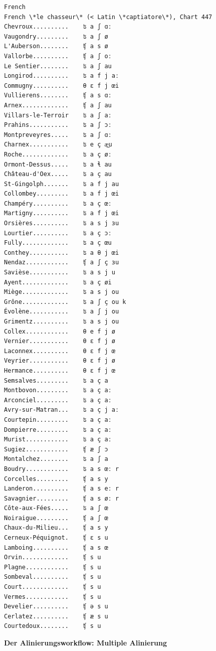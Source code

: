 \begin{verbatim}
French
French \*le chasseur\* (< Latin \*captiatore\*), Chart 447
Chevroux..........    ʦ a ʃ ɑː
Vaugondry.........    ʦ a ʃ ø
L'Auberson........    ʧ a s ø
Vallorbe..........    ʧ a ʃ oː
Le Sentier........    ʦ a ʃ au
Longirod..........    ʦ a f j aː
Commugny..........    θ ɛ f j œi
Vullierens........    ʧ a s ɑː
Arnex.............    ʧ a ʃ au
Villars-le-Terroir    ʦ a ʃ aː
Prahins...........    ʦ a ʃ ɔː
Montpreveyres.....    ʦ a ʃ ɑː
Charnex...........    ʦ e ç æ͜u
Roche.............    ʦ a ç øː
Ormont-Dessus.....    ʦ a ɬ au
Château-d'Oex.....    ʦ a ç au
St-Gingolph.......    ʦ a f j au
Collombey.........    ʦ a f j œi
Champéry..........    ʦ a ç œː
Martigny..........    ʦ a f j œi
Orsières..........    ʦ a s j ɜu
Lourtier..........    ʦ a ç ɔː
Fully.............    ʦ a ç œu
Conthey...........    ʦ a θ j œi
Nendaz............    ʧ a ʃ ç ɜu
Savièse...........    ʦ a s j u
Ayent.............    ʦ a ç øi
Miège.............    ʦ a s j ou
Grône.............    ʦ a ʃ ç ou k
Évolène...........    ʦ a ʃ j ou
Grimentz..........    ʦ a s j ou
Collex............    θ e f j ø
Vernier...........    θ ɛ f j ø
Laconnex..........    θ ɛ f j œ
Veyrier...........    θ ɛ f j ø
Hermance..........    θ ɛ f j œ
Semsalves.........    ʦ a ç a
Montbovon.........    ʦ a ç aː
Arconciel.........    ʦ a ç aː
Avry-sur-Matran...    ʦ a ç j aː
Courtepin.........    ʦ a ç aː
Dompierre.........    ʦ a ç aː
Murist............    ʦ a ç aː
Sugiez............    ʧ æ ʃ ɔ
Montalchez........    ʦ a ʃ a
Boudry............    ʦ a s œː r
Corcelles.........    ʧ a s y
Landeron..........    ʧ a s eː r
Savagnier.........    ʧ a s øː r
Côte-aux-Fées.....    ʦ a ʃ œ
Noiraigue.........    ʧ a ʃ œ
Chaux-du-Milieu...    ʧ a s y
Cerneux-Péquignot.    ʧ ɛ s u
Lamboing..........    ʧ a s œ
Orvin.............    ʧ s u
Plagne............    ʧ s u
Sombeval..........    ʧ s u
Court.............    ʧ s u
Vermes............    ʧ s u
Develier..........    ʧ ə s u
Cerlatez..........    ʧ æ s u
Courtedoux........    ʧ s u
\end{verbatim}



\vspace{0.5cm}\par\noindent\textbf{Der Alinierungsworkflow: Multiple Alinierung}\vspace{0.5cm}

